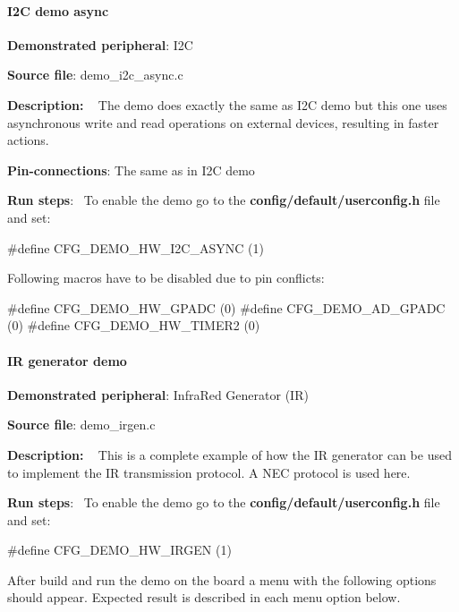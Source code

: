 \paragraph*{I2\+C demo async}


\begin{DoxyItemize}
\item {\bfseries Demonstrated peripheral}\+: I2\+C
\item {\bfseries Source file}\+: demo\+\_\+i2c\+\_\+async.\+c
\item {\bfseries Description\+:} ~\newline
 The demo does exactly the same as I2\+C demo but this one uses asynchronous write and read operations on external devices, resulting in faster actions.
\item {\bfseries Pin-\/connections}\+: The same as in I2\+C demo
\item {\bfseries Run steps}\+:~\newline
 To enable the demo go to the {\bfseries {\ttfamily config/default/userconfig.\+h}} file and set\+: 
\begin{DoxyCode}
\textcolor{preprocessor}{#define CFG\_DEMO\_HW\_I2C\_ASYNC      (1)}
\end{DoxyCode}
 Following macros have to be disabled due to pin conflicts\+: 
\begin{DoxyCode}
\textcolor{preprocessor}{#define CFG\_DEMO\_HW\_GPADC          (0)}
\textcolor{preprocessor}{#define CFG\_DEMO\_AD\_GPADC          (0)}
\textcolor{preprocessor}{#define CFG\_DEMO\_HW\_TIMER2         (0)}
\end{DoxyCode}

\end{DoxyItemize}

\paragraph*{I\+R generator demo}


\begin{DoxyItemize}
\item {\bfseries Demonstrated peripheral}\+: Infra\+Red Generator (I\+R)
\item {\bfseries Source file}\+: demo\+\_\+irgen.\+c
\item {\bfseries Description\+:} ~\newline
 This is a complete example of how the I\+R generator can be used to implement the I\+R transmission protocol. A N\+E\+C protocol is used here.
\item {\bfseries Run steps}\+:~\newline
 To enable the demo go to the {\bfseries {\ttfamily config/default/userconfig.\+h}} file and set\+: 
\begin{DoxyCode}
\textcolor{preprocessor}{#define CFG\_DEMO\_HW\_IRGEN      (1)}
\end{DoxyCode}
 After build and run the demo on the board a menu with the following options should appear. Expected result is described in each menu option below.
\end{DoxyItemize}

